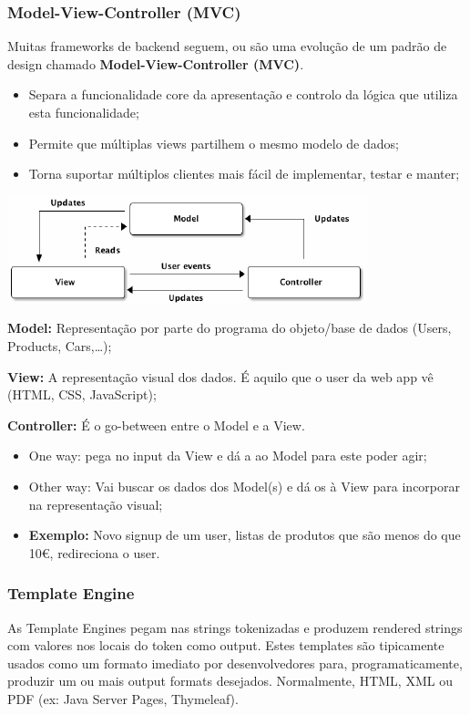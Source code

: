 \documentclass{article}
\begin{document}
\pagebreak

\subsubsection*{Model-View-Controller (MVC)}

Muitas frameworks de backend seguem, ou são uma evolução de um padrão de
design chamado \textbf{Model-View-Controller (MVC)}.
\begin{itemize}
  \item Separa a funcionalidade core da apresentação  e controlo da lógica
  que utiliza esta funcionalidade;
  \item Permite que múltiplas views partilhem o mesmo modelo de dados;
  \item Torna suportar múltiplos clientes mais fácil de implementar, testar
  e manter; 
\end{itemize}

\begin{center}
  \includegraphics[scale=0.7]{75}
\end{center}

\begin{flushleft}
  \textbf{Model:} Representação por parte do programa do objeto/base de dados (Users, Products, Cars,\dots);
  
  \textbf{View:} A representação visual dos dados. É aquilo que o user
  da web app vê (HTML, CSS, JavaScript);

  \textbf{Controller:} É o go-between entre o Model e a View.
  \begin{itemize}
    \item One way: pega no input da View e dá a ao Model
    para este poder agir;
    \item Other way: Vai buscar os dados dos Model(s) e dá os à View
    para incorporar na representação visual;
    \item \textbf{Exemplo:} Novo signup de um user, listas de produtos
    que são menos do que 10€, redireciona o user.
  \end{itemize}

  \subsubsection{Template Engine}

  As Template Engines pegam nas strings tokenizadas e produzem
  rendered strings com valores nos locais do token como output.
  Estes templates são tipicamente usados como um formato imediato por
  desenvolvedores para, programaticamente, produzir um ou mais
  output formats desejados. Normalmente, HTML, XML ou PDF (ex:
  Java Server Pages, Thymeleaf).
\end{flushleft}
\end{document}
